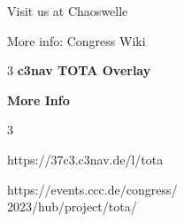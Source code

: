 \documentclass[a4paper]{article}
\newcommand{\FooterColumnCount}{3}
\newcommand{\FooterColumnCount}{2}
\begin{document}
{{Visit us at Chaoswelle

More info: Congress Wiki
}
\vfill

\large


\begin{multicols}{\FooterColumnCount}
\Large
\textbf{c3nav TOTA Overlay}\par
\vspace{0.5em}

\columnbreak


\textbf{More Info}


\end{multicols}

\begin{multicols}{\FooterColumnCount}

https://37c3.c3nav.de/l/tota

\columnbreak


https://events.ccc.de/congress/\\2023/hub/project/tota/


\end{multicols}


\pagebreak
}
\end{document}
